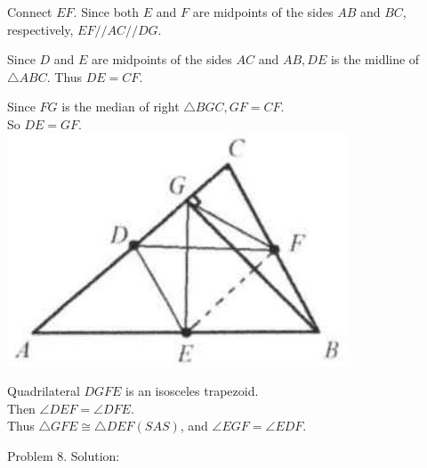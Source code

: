 \documentclass[10pt]{article}
\begin{document}
Connect \(E F\). Since both \(E\) and \(F\) are midpoints of the sides \(A B\) and \(B C\), respectively, \(E F / / A C / / D G\).

Since \(D\) and \(E\) are midpoints of the sides \(A C\) and \(A B, D E\) is the midline of \(\triangle A B C\). Thus \(D E=C F\).

Since \(F G\) is the median of right \(\triangle B G C, G F=C F\).\\
So \(D E=G F\).\\
\includegraphics[max width=\textwidth, center]{2025_04_17_97bc1f7e44d93c271a88g-050(2)}

Quadrilateral \(D G F E\) is an isosceles trapezoid.\\
Then \(\angle D E F=\angle D F E\).\\
Thus \(\triangle G F E \cong \triangle D E F(S A S)\), and \(\angle E G F=\angle E D F\).

Problem 8. Solution:
\end{document}

